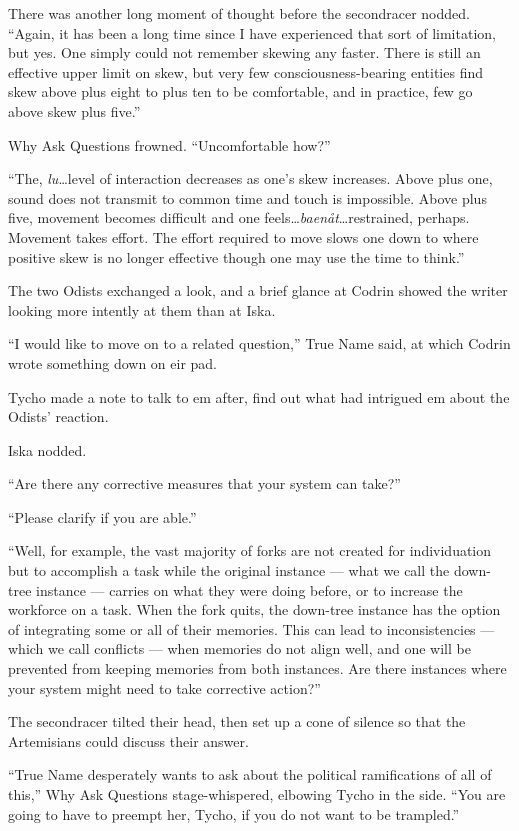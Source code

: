 There was another long moment of thought before the secondracer nodded. ``Again, it has been a long time since I have experienced that sort of limitation, but yes. One simply could not remember skewing any faster. There is still an effective upper limit on skew, but very few consciousness-bearing entities find skew above plus eight to plus ten to be comfortable, and in practice, few go above skew plus five.''

Why Ask Questions frowned. ``Uncomfortable how?''

``The, \emph{lu}\ldots level of interaction decreases as one's skew increases. Above plus one, sound does not transmit to common time and touch is impossible. Above plus five, movement becomes difficult and one feels\ldots{}\emph{baenåt}\ldots restrained, perhaps. Movement takes effort. The effort required to move slows one down to where positive skew is no longer effective though one may use the time to think.''

The two Odists exchanged a look, and a brief glance at Codrin showed the writer looking more intently at them than at Iska.

``I would like to move on to a related question,'' True Name said, at which Codrin wrote something down on eir pad.

Tycho made a note to talk to em after, find out what had intrigued em about the Odists' reaction.

Iska nodded.

``Are there any corrective measures that your system can take?''

``Please clarify if you are able.''

``Well, for example, the vast majority of forks are not created for individuation but to accomplish a task while the original instance — what we call the down-tree instance — carries on what they were doing before, or to increase the workforce on a task. When the fork quits, the down-tree instance has the option of integrating some or all of their memories. This can lead to inconsistencies — which we call conflicts — when memories do not align well, and one will be prevented from keeping memories from both instances. Are there instances where your system might need to take corrective action?''

The secondracer tilted their head, then set up a cone of silence so that the Artemisians could discuss their answer.

``True Name desperately wants to ask about the political ramifications of all of this,'' Why Ask Questions stage-whispered, elbowing Tycho in the side. ``You are going to have to preempt her, Tycho, if you do not want to be trampled.''

